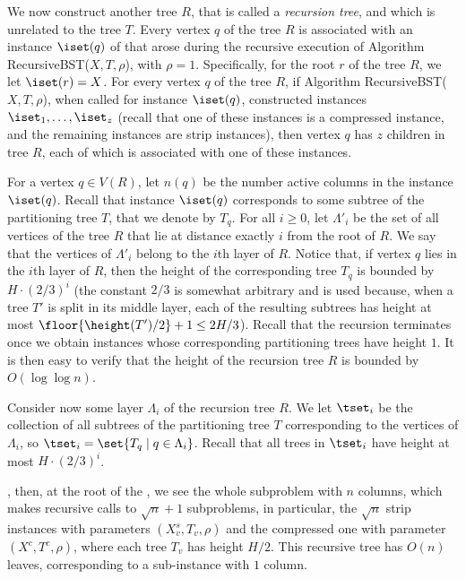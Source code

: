 \documentclass[11pt]{article}
\numberwithin{equation}{section}
\theoremstyle{definition}
\theoremstyle{plain}
\begin{document}
We now construct another tree $R$, that is called a \emph{recursion tree}, and which is unrelated to the tree $T$. Every vertex $q$ of the tree $R$ is associated with an instance $\iset(q)$ of \minsat that arose during the recursive execution of Algorithm {\sc RecursiveBST}($X,T,\rho$), with $\rho=1$. 
Specifically, for the root $r$ of the tree $R$, we let $\iset(r)=X$. For every vertex $q$ of the tree $R$, if Algorithm  {\sc RecursiveBST}($X,T,\rho$), when called for instance $\iset(q)$, constructed instances $\iset_1,\ldots,\iset_z$ (recall that one of these instances is a compressed instance, and the remaining instances are strip instances), then vertex $q$ has $z$ children in tree $R$, each of which is associated with one of these instances.

For a vertex $q\in V(R)$, let $n(q)$ be the number active columns in the instance $\iset(q)$. 
Recall that instance $\iset(q)$ corresponds to some subtree of the partitioning tree $T$, that we denote by $T_q$. 
For all $i\geq 0$, let $\Lambda'_i$ be the set of all vertices of the tree $R$ that lie at distance exactly $i$ from the root of $R$. We say that the vertices of $\Lambda'_i$ belong to the $i$th layer of $R$. Notice that, if vertex $q$ lies in the $i$th layer of $R$, then the height of the corresponding tree $T_q$ is bounded by $H\cdot (2/3)^i$ (the constant $2/3$ is somewhat arbitrary and is used because, when a tree $T'$ is split in its middle layer, each of the resulting subtrees has height at most $\floor{\height(T')/2}+1\leq 2H/3$).
Recall that the recursion terminates once we obtain instances whose corresponding partitioning trees have height $1$. It is then easy to verify that the height of the recursion tree $R$ is bounded by $O(\log\log n)$.

%
%
%
%


Consider now some layer $\Lambda_i$ of the recursion tree $R$. We let $\tset_i$ be the collection of all subtrees of the partitioning tree $T$ corresponding to the vertices of $\Lambda_i$, so $\tset_i=\set{T_q\mid q\in \Lambda_i}$. Recall that all trees in $\tset_i$ have height at most $H\cdot (2/3)^i$.


\iffalse
, then, at the root of the , we see the whole subproblem with $n$ columns, which makes recursive calls to $\sqrt{n}+1$ subproblems, in particular, the $\sqrt{n}$ strip instances with parameters $(X^s_v, T_v, \rho)$ and the compressed one with parameter $(X^c, T^c, \rho)$, where each tree $T_v$ has height $H/2$.
This recursive tree has $O(n)$ leaves, corresponding to a sub-instance with $1$ column. 
 
\end{document}
